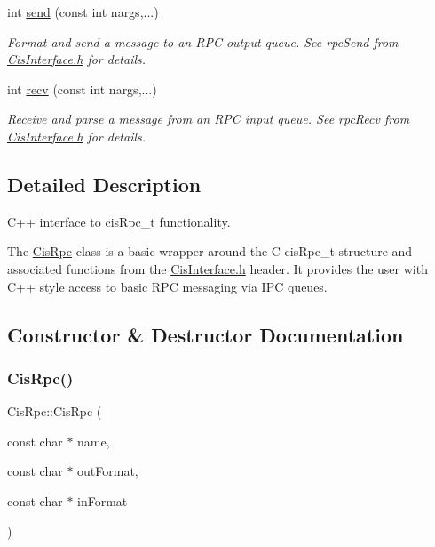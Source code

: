 \begin{DoxyCompactItemize}
int \mbox{\hyperlink{classCisRpc_afb4143aa59acfe94df91435262cde01e}{send}} (const int nargs,...)
\begin{DoxyCompactList}\small\item\em Format and send a message to an R\+PC output queue. See rpc\+Send from \mbox{\hyperlink{CisInterface_8h_source}{Cis\+Interface.\+h}} for details. \end{DoxyCompactList}\item 
int \mbox{\hyperlink{classCisRpc_a6b1acb06791551c0c3096f678690e315}{recv}} (const int nargs,...)
\begin{DoxyCompactList}\small\item\em Receive and parse a message from an R\+PC input queue. See rpc\+Recv from \mbox{\hyperlink{CisInterface_8h_source}{Cis\+Interface.\+h}} for details. \end{DoxyCompactList}\end{DoxyCompactItemize}


\subsection{Detailed Description}
C++ interface to cis\+Rpc\+\_\+t functionality. 

The \mbox{\hyperlink{classCisRpc}{Cis\+Rpc}} class is a basic wrapper around the C cis\+Rpc\+\_\+t structure and associated functions from the \mbox{\hyperlink{CisInterface_8h_source}{Cis\+Interface.\+h}} header. It provides the user with C++ style access to basic R\+PC messaging via I\+PC queues. 

\subsection{Constructor \& Destructor Documentation}
\mbox{\label{classCisRpc_a91e65146ad3b4d1a3999835003b1cf37}} 
\subsubsection{\texorpdfstring{Cis\+Rpc()}{CisRpc()}}
{\footnotesize\ttfamily Cis\+Rpc\+::\+Cis\+Rpc (\begin{DoxyParamCaption}\item[{const char $\ast$}]{name,  }\item[{const char $\ast$}]{out\+Format,  }\item[{const char $\ast$}]{in\+Format }\end{DoxyParamCaption})\hspace{0.3cm}{\ttfamily [inline]}}



